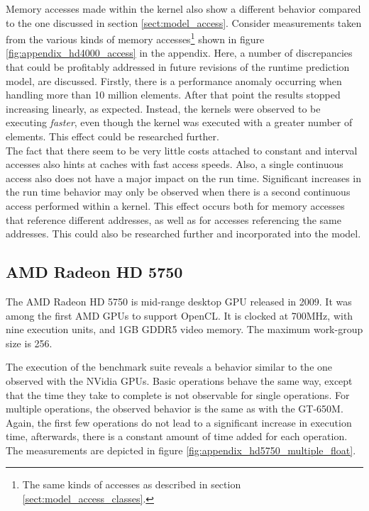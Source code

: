 Memory accesses made within the kernel also show a different behavior compared to the one discussed in section \ref{sect:model_access}. Consider measurements taken from the various kinds of memory accesses\footnote{The same kinds of accesses as described in section \ref{sect:model_access_classes}.} shown in figure \ref{fig:appendix_hd4000_access} in the appendix. Here, a number of discrepancies that could be profitably addressed in future revisions of the runtime prediction model, are discussed. Firstly, there is a performance anomaly occurring when handling more than 10 million elements. After that point the results stopped increasing linearly, as expected. Instead, the kernels were observed to be executing \textit{faster}, even though the kernel was executed with a greater number of elements. This effect could be researched further. \\

The fact that there seem to be very little costs attached to constant and interval accesses also hints at caches with fast access speeds. Also, a single continuous access also does not have a major impact on the run time. Significant increases in the run time behavior may only be observed when there is a second continuous access performed within a kernel. This effect occurs both for memory accesses that reference different addresses, as well as for accesses referencing the same addresses. This could also be researched further and incorporated into the model. 

\subsection{AMD Radeon HD 5750}
\label{sect:future_othergpus_amd5750}
The AMD Radeon HD 5750 is mid-range desktop GPU released in 2009. It was among the first AMD GPUs to support OpenCL. It is clocked at 700MHz, with nine execution units, and 1GB GDDR5 video memory. The maximum work-group size is 256. \\  \cite{guru2009hd5750,amd2009hd5750}

The execution of the benchmark suite reveals a behavior similar to the one observed with the NVidia GPUs. Basic operations behave the same way, except that the time they take to complete is not observable for single operations. For multiple operations, the observed behavior is the same as with the GT-650M. Again, the first few operations do not lead to a significant increase in execution time, afterwards, there is a constant amount of time added for each operation. The measurements are depicted in figure \ref{fig:appendix_hd5750_multiple_float}. \\

